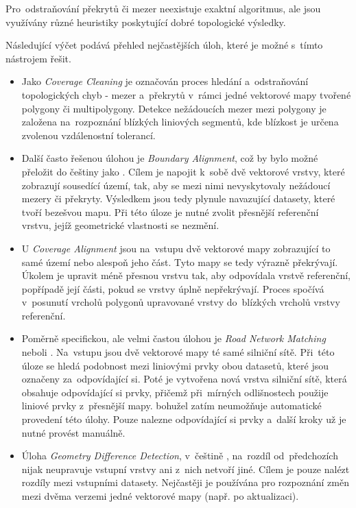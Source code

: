 Pro~odstraňování překrytů či mezer neexistuje exaktní algoritmus,
ale jsou vy\-užívány různé heuristiky poskytující dobré topologické výsledky.

Následující výčet podává přehled nejčastějších úloh, které je možné 
s~tímto nástrojem řešit.

\begin{itemize}
 \item Jako \textit{Coverage Cleaning} je  označován proces hledání
    a~odstraňování topologických chyb - mezer a~překrytů v~rámci jedné
    vektorové mapy tvořené polygony či multipolygony. Detekce nežádoucích
    mezer mezi polygony je založena na~rozpoznání blízkých liniových segmentů,
    kde blízkost je určena zvolenou vzdálenostní to\-le\-rancí. 

 \item Další často řešenou úlohou je \textit{Boundary Alignment}, což by
    bylo možné přeložit do češtiny jako . 
    Cílem je napojit k~sobě dvě vektorové vrstvy, které zobrazují sousedící
    území, tak, aby se mezi nimi nevyskytovaly nežádoucí mezery či překryty.
    Výsledkem jsou tedy plynule navazující datasety, které tvoří bezešvou mapu.
    Při této úloze je nutné zvolit přesnější referenční vrstvu, jejíž 
    geometrické vlastnosti se nezmění.

 \item U \textit{Coverage Alignment} jsou na~vstupu dvě vektorové
    mapy zobrazující to samé území nebo alespoň jeho část. Tyto mapy se 
    tedy výrazně překrývají. Úkolem je upravit méně přesnou vrstvu tak,
    aby odpovídala vrstvě referenční, popřípadě její části, pokud se vrstvy
    úplně nepřekrývají. Proces spočívá v~posunutí vrcholů polygonů upravované
    vrstvy do~blízkých vrcholů vrstvy referenční.

 \item Poměrně specifickou, ale velmi častou úlohou je \textit{Road Network 
    Matching} neboli . Na~vstupu jsou dvě 
    vektorové mapy té samé silniční sítě. Při~této úloze se hledá podobnost
    mezi liniovými prvky obou datasetů, které jsou označeny za~odpovídající si.
    Poté je vytvořena nová vrstva silniční sítě, která obsahuje odpovídající
    si prvky, přičemž při~mírných odlišnostech použije liniové prvky z~přesnější
    mapy.  bohužel zatím neumožňuje automatické provedení této
    úlohy. Pouze nalezne odpovídající si prvky a~další kroky už je nutné provést
    manuálně.

\item Úloha \textit{Geometry Difference Detection}, v~češtině , na~roz\-díl od~předchozích nijak neupravuje vstupní
    vrstvy ani z~nich netvoří jiné. Cílem je pouze nalézt rozdíly mezi vstupními
    datasety. Nejčastěji je používána pro rozpoznání změn mezi dvěma verzemi
    jedné vektorové mapy (např. po aktualizaci).
\end{itemize}

